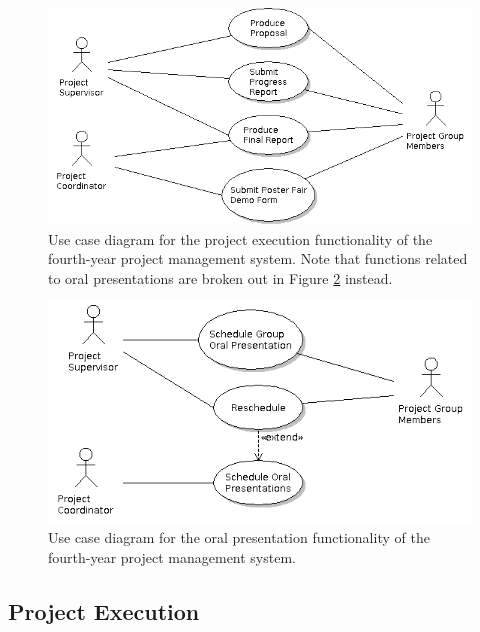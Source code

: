 \begin{figure}[!ht]
\centering \includegraphics[width=6in]{./img/case-study-fourth-year-system/project-lifecycle}
\caption{Use case diagram for the project execution functionality of the fourth-year project management system. Note that functions related to oral presentations are broken out in Figure \ref{fig:case-4ys-use-case-oral-reports} instead.}
\label{fig:case-4ys-use-case-project-lifecycle}
\end{figure}

\begin{figure}[!ht]
\centering \includegraphics[width=6in]{./img/case-study-fourth-year-system/oral-report-scheduling}
\caption{Use case diagram for the oral presentation functionality of the fourth-year project management system.}
\label{fig:case-4ys-use-case-oral-reports}
\end{figure}


\FloatBarrier

\subsection{Project Execution}
\label{sec:4ys-project-execution}

